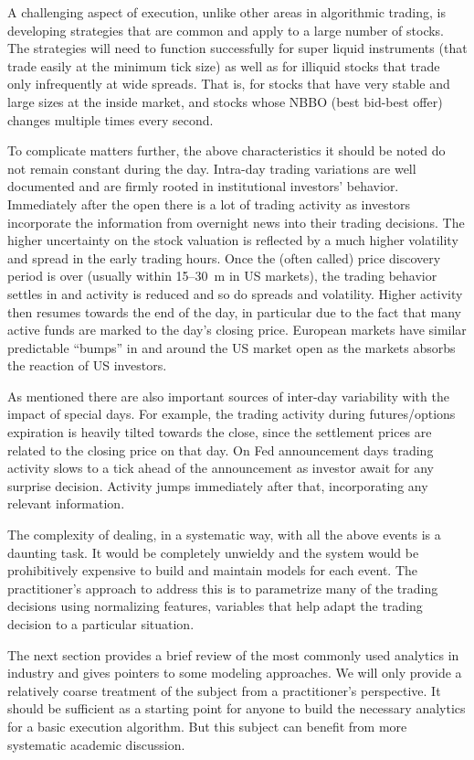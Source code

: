 A challenging aspect of execution, unlike other areas in algorithmic trading, is developing strategies that are common and apply to a large number of stocks. The strategies will need to function successfully for super liquid instruments (that trade easily at the minimum tick size) as well as for illiquid stocks that trade only infrequently at wide spreads. That is, for stocks that have very stable and large sizes at the inside market, and stocks whose NBBO (best bid-best offer) changes multiple times every second.


To complicate matters further, the above characteristics it should be noted do not remain constant during the day. Intra-day trading variations are well documented and are firmly rooted in institutional investors' behavior. Immediately after the open there is a lot of trading activity as investors incorporate the information from overnight news into their trading decisions. The higher uncertainty on the stock valuation is reflected by a much higher volatility and spread in the early trading hours. Once the (often called) price discovery period is over (usually within 15--30~m in US markets), the trading behavior settles in and activity is reduced and so do spreads and volatility. Higher activity then resumes towards the end of the day, in particular due to the fact that many active funds are marked to the day's closing price. European markets have similar predictable ``bumps'' in and around the US market open as the markets absorbs the reaction of US investors.


As mentioned there are also important sources of inter-day variability with the impact of special days. For  example, the trading activity during futures/options expiration is heavily tilted towards the close, since the settlement prices are related to the closing price on that day. On Fed announcement days trading activity slows to a tick ahead of the announcement as investor await for any surprise decision. Activity jumps immediately after that, incorporating any relevant information.


The complexity of dealing, in a systematic way, with all the above events is a daunting task. It would be completely unwieldy and the system would be prohibitively expensive to build and maintain models for each event. The practitioner's approach to address this is to parametrize many of the trading decisions using normalizing features, variables that help adapt the trading decision to a particular situation.


The next section provides a brief review of the most commonly used analytics in industry and gives pointers to some modeling approaches. We will only provide a relatively coarse treatment of the subject from a practitioner's perspective. It should be sufficient as a starting point for anyone to build  the necessary analytics for a basic execution algorithm. But this subject can benefit from more systematic academic discussion.



